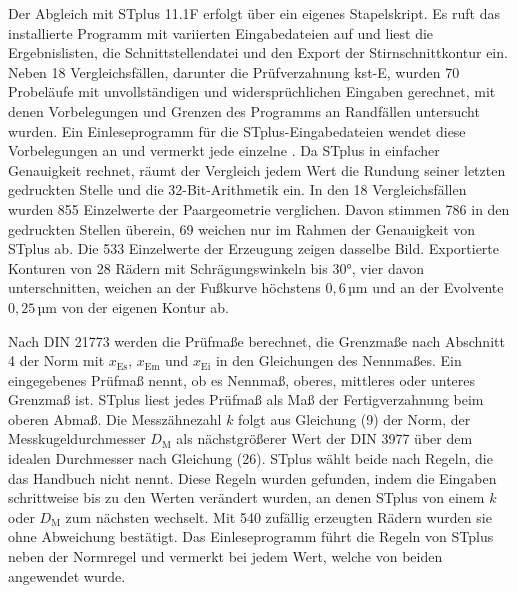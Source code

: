 Der Abgleich mit STplus 11.1F erfolgt über ein eigenes Stapelskript. Es ruft das installierte Programm mit variierten Eingabedateien auf und liest die Ergebnislisten, die Schnittstellendatei und den Export der Stirnschnittkontur ein. Neben 18 Vergleichsfällen, darunter die Prüfverzahnung kst-E, wurden 70 Probeläufe mit unvollständigen und widersprüchlichen Eingaben gerechnet, mit denen Vorbelegungen und Grenzen des Programms an Randfällen untersucht wurden. Ein Einleseprogramm für die STplus-Eingabedateien wendet diese Vorbelegungen an und vermerkt jede einzelne \cite{STplus11-1F}. Da STplus in einfacher Genauigkeit rechnet, räumt der Vergleich jedem Wert die Rundung seiner letzten gedruckten Stelle und die 32-Bit-Arithmetik ein. In den 18 Vergleichsfällen wurden 855 Einzelwerte der Paargeometrie verglichen. Davon stimmen 786 in den gedruckten Stellen überein, 69 weichen nur im Rahmen der Genauigkeit von STplus ab. Die 533 Einzelwerte der Erzeugung zeigen dasselbe Bild. Exportierte Konturen von 28 Rädern mit Schrägungswinkeln bis $30$°, vier davon unterschnitten, weichen an der Fußkurve höchstens $0{,}6$\,µm und an der Evolvente $0{,}25$\,µm von der eigenen Kontur ab.

Nach DIN 21773 werden die Prüfmaße berechnet, die Grenzmaße nach Abschnitt 4 der Norm mit $x_{\mathrm{Es}}$, $x_{\mathrm{Em}}$ und $x_{\mathrm{Ei}}$ in den Gleichungen des Nennmaßes. Ein eingegebenes Prüfmaß nennt, ob es Nennmaß, oberes, mittleres oder unteres Grenzmaß ist. STplus liest jedes Prüfmaß als Maß der Fertigverzahnung beim oberen Abmaß. Die Messzähnezahl $k$ folgt aus Gleichung (9) der Norm, der Messkugeldurchmesser $D_{\mathrm{M}}$ als nächstgrößerer Wert der DIN 3977 \cite[Tabelle 1, S.~2]{DIN3977} über dem idealen Durchmesser nach Gleichung (26). STplus wählt beide nach Regeln, die das Handbuch nicht nennt. Diese Regeln wurden gefunden, indem die Eingaben schrittweise bis zu den Werten verändert wurden, an denen STplus von einem $k$ oder $D_{\mathrm{M}}$ zum nächsten wechselt. Mit 540 zufällig erzeugten Rädern wurden sie ohne Abweichung bestätigt. Das Einleseprogramm führt die Regeln von STplus neben der Normregel und vermerkt bei jedem Wert, welche von beiden angewendet wurde.



